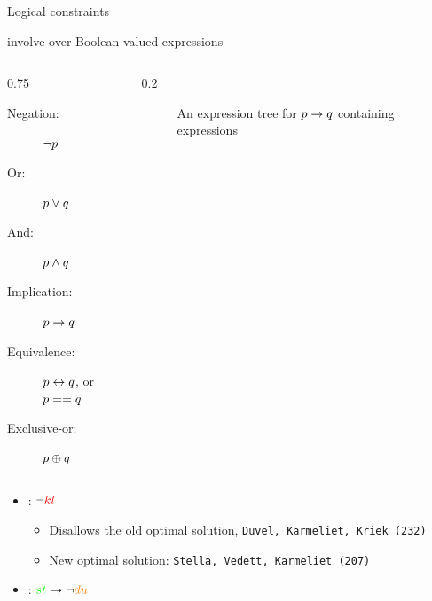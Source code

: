 \documentclass{cons-beamer}
\begin{document}
\begin{frame}{Logical constraints}

	 involve  over Boolean-valued expressions

  \begin{columns}
    \begin{column}{0.75\textwidth}
  \begin{description}
	  \item[Negation:] $\neg p$
	  \item[Or:] $p \vee q$
	  \item[And:] $p \wedge q$
	  \item[Implication:] $p \rightarrow q$
	  \item[Equivalence:] $p \leftrightarrow q$, or $p == q$
	  \item[Exclusive-or:] $p \oplus q$ 
  \end{description}
    \end{column}
    \begin{column}{0.2\textwidth}
	    \centering
	\begin{figure}
		\caption{An expression tree for $p \rightarrow q$ containing  expressions}
	\end{figure}

    \end{column}
  \end{columns}

  \parBreak
  \centering

  \begin{itemize}
	  \item \Eg {}: \quad $\neg \textcolor{red}{kl}$
		  \begin{itemize}
			  \item Disallows the old optimal solution, \texttt{Duvel, Karmeliet, Kriek (232)}
			  \item New optimal solution: \texttt{Stella, Vedett, Karmeliet (207)}
		  \end{itemize}
	  \item \Eg {}: \quad $\textcolor{green}{st} \rightarrow \neg \textcolor{orange}{du}$
  \end{itemize}
\end{frame}
\end{document}
